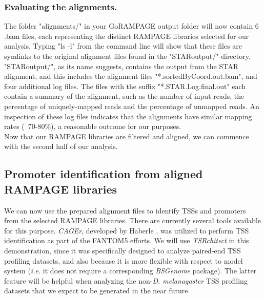 \documentclass[runningheads,a4paper]{llncs}
\begin{document}
\begin{linenumbers}
\subsubsection{Evaluating the alignments.}

The folder "alignments/" in your GoRAMPAGE output folder will now contain 6 .bam files, each representing the distinct RAMPAGE libraries selected for our analysis.
Typing "ls -l" from the command line will show that these files are symlinks to the original alignment files found in the "STARoutput/" directory.
"STARoutput/", as its name suggests, contains the output from the STAR alignment, and this includes the alignment files "*.sortedByCoord.out.bam", and four additional log files.
The files with the suffix "*.STAR.Log.final.out" each contain a summary of the alignment, such as the number of input reads, the percentage of uniquely-mapped reads and the percentage of unmapped reads.
An inspection of these log files indicates that the alignments have similar mapping rates (~70-80\%), a reasonable outcome for our purposes.\\

\noindent
Now that our RAMPAGE libraries are filtered and aligned, we can commence with the second half of our analysis.

\subsection{Promoter identification from aligned RAMPAGE libraries}

We can now use the prepared alignment files to identify TSSs and promoters from the selected RAMPAGE libraries.
There are currently several tools available for this purpose.
\textit{CAGEr}, developed by Haberle \cite{Haberle:2015fp}, was utilized to perform TSS identification as part of the FANTOM5 efforts.
We will use \textit{TSRchitect} in this demonstration, since it was specifically designed to analyze paired-end TSS profiling datasets, and also because it is more flexible with respect to model system (\textit{i.e.} it does not require a corresponding \textit{BSGenome} package).
The latter feature will be helpful when analyzing the non-\textit{D. melanagaster} TSS profiling datasets that we expect to be generated in the near future.


\end{linenumbers}
\end{document}
